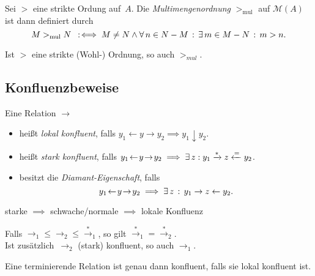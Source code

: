 \documentclass{cheat-sheet}
\newcommand{\from}{\leftarrow}
\newcommand{\reducesTo}{\xrightarrow{*}}
\newcommand{\fromOrEq}{\xleftarrow{=}}
\newcommand{\joinable}{\downarrow}
\newcommand{\Multisets}{\mathcal{M}} %
\begin{document}
\begin{defn}
  Sei ${>}$ eine strikte Ordung auf~$A$.
  Die \emph{Multimengenordnung} $>_{\text{mul}}$ auf $\Multisets(A)$ ist dann definiert durch
  \[
    M >_{\text{mul}} N \enspace:\!\iff M \neq N \wedge \forall \, {n \in N - M} \,:\, \exists \, {m \in M - N} \,:\, m > n.
  \]
\end{defn}

\begin{lem}
  Ist $>$ eine strikte (Wohl-) Ordnung, so auch $>_{\textit{mul}}$.
\end{lem}


\subsection{Konfluenzbeweise}

\begin{defn}
  Eine Relation ${\to}$
  \begin{itemize}
    \item heißt \emph{lokal konfluent}, falls $y_1 \!\from\! y \to y_2 \implies y_1 \joinable y_2$.
    \item heißt \emph{stark konfluent}, falls $y_1 \!\from\! y \!\to\! y_2 \implies \ex{z\!}\! y_1 \reducesTo z \fromOrEq y_2$.
    \item besitzt die \emph{Diamant-Eigenschaft}, falls
    \[
      y_1 \!\from\! y \!\to\! y_2 \implies \ex{z} y_1 \to z \from y_2.
    \]
  \end{itemize}
\end{defn}

\begin{bem}
  starke $\implies$ schwache/normale $\implies$ lokale Konfluenz
\end{bem}

\begin{lem}
  \begin{minipage}[t]{0.8 \linewidth}
    Falls ${\to_1} \leq {\to_2} \leq {\xrightarrow{*}_1}$, so gilt ${\xrightarrow{*}_1} = {\xrightarrow{*}_2}$. \\
    Ist zusätzlich~$\to_2$ (stark) konfluent, so auch ${\to_1}$.
  \end{minipage}
\end{lem}

\begin{lem}
  Eine terminierende Relation ist genau dann konfluent, falls sie lokal konfluent ist.
\end{lem}
\end{document}
